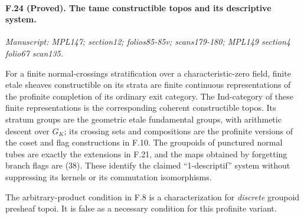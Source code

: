 \paragraph{F.24 (Proved). The tame
constructible topos and its descriptive system.}
\textit{Manuscript: MPL147; section12; folios85-85v; scans179-180; MPL149 section4 folio67 scan135.}

For a finite normal-crossings stratification over a characteristic-zero
field, finite etale sheaves constructible on its strata are finite
continuous representations of the profinite completion of its ordinary
exit category. The Ind-category of these finite representations is the
corresponding coherent constructible topos. Its stratum groups are the
geometric etale fundamental groups, with arithmetic descent over $G_K$;
its crossing sets and compositions are the profinite versions of the
coset and flag constructions in F.10. The groupoids of punctured
normal tubes are exactly the extensions in F.21, and the maps obtained
by forgetting branch flags are (38). These identify the claimed
``1-descriptif'' system without suppressing its kernels or its
commutation isomorphisms.

The arbitrary-product condition in F.8 is a characterization for
\emph{discrete} groupoid presheaf topoi. It is false as a necessary
condition for this profinite variant.

